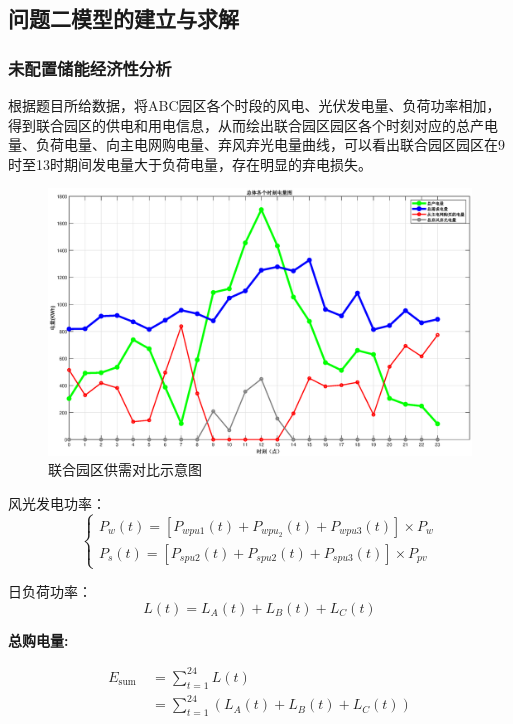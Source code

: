 \documentclass{cumcmthesis}
\begin{document}
\newpage 
  
 \subsection{问题二模型的建立与求解}
\subsubsection{未配置储能经济性分析}
根据题目所给数据，将ABC园区各个时段的风电、光伏发电量、负荷功率相加，得到联合园区的供电和用电信息，从而绘出联合园区园区各个时刻对应的总产电量、负荷电量、向主电网购电量、弃风弃光电量曲线，可以看出联合园区园区在9时至13时期间发电量大于负荷电量，存在明显的弃电损失。

\begin{figure}[!h]
\centering
\includegraphics[width=.6\textwidth]{figures/Q2line.eps}
\caption{联合园区供需对比示意图}
\end{figure}

风光发电功率：
\begin{equation}
\left\{\begin{array}{l}
P_w(t)=\left[P_{w p u 1}(t)+P_{w p u_2}(t)+P_{w p u 3}(t)\right] \times P_w \\
P_s(t)=\left[P_{s p u 2}(t)+P_{s p u 2}(t)+P_{s p u 3}(t)\right] \times P_{p v}
\end{array}\right.
\end{equation}

日负荷功率：
\begin{equation}
L(t)=L_A(t)+L_B(t)+L_C(t)
\end{equation}

\textbf{总购电量:}

\begin{equation}
\begin{aligned}
E_{\text {sum }} & =\sum_{t=1}^{24} L(t) \\
& =\sum_{t=1}^{24}\left(L_A(t)+L_B(t)+L_C(t)\right)
\end{aligned}
\end{equation}
\end{document}
